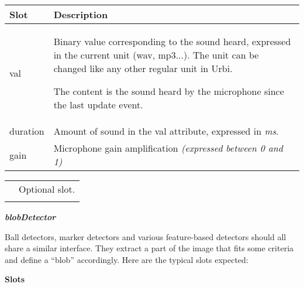 \documentclass[a4paper]{article}
\begin{document}
\begin{flushleft}
\tablehead{}
\begin{supertabular}{|m{3.293cm}|m{11.997cm}|}
\hline
\sffamily\bfseries Slot &
\sffamily\bfseries Description\\\hline
val &
{\sffamily Binary value corresponding to the
sound heard, expressed in the current unit (wav, mp3...). The unit can
be changed like any other regular unit in Urbi. }

\textsf{The content is the sound heard by the
microphone since the last }update\textsf{ event.}\\\hline
duration &
\textsf{Amount of sound in the }val\textsf{
attribute, expressed in }\textsf{\textit{ms}}\textsf{.}\\\hline
gain &
\textsf{Microphone gain amplification
}\textsf{\textit{(expressed between 0 and 1)}}\\\hline
\end{supertabular}
\end{flushleft}
\begin{flushleft}
\tablehead{}
\begin{supertabular}{|m{1.717cm}|m{10.464cm}}
\hhline{-~}
 &
\sffamily Optional slot.\\\hhline{-~}
\end{supertabular}
\end{flushleft}
{\sffamily\bfseries\itshape
blobDetector}

{\sffamily
Ball detectors, marker detectors and various feature-based detectors
should all share a similar interface. They extract a part of the image
that fits some criteria and define a “blob” accordingly. Here are the
typical slots expected:}

{\sffamily\bfseries
Slots}
\end{document}
